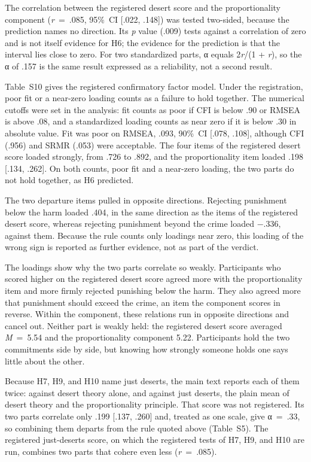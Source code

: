 The correlation between the registered desert score and the proportionality component (\emph{r}~=~.085, 95\%~CI {[}.022, .148{]}) was tested two-sided, because the prediction names no direction. Its \emph{p} value (.009) tests against a correlation of zero and is not itself evidence for H6; the evidence for the prediction is that the interval lies close to zero. For two standardized parts, α equals 2\emph{r}/(1 + \emph{r}), so the α of .157 is the same result expressed as a reliability, not a second result.

Table~S10 gives the registered confirmatory factor model. Under the registration, poor fit or a near-zero loading counts as a failure to hold together. The numerical cutoffs were set in the analysis: fit counts as poor if CFI is below .90 or RMSEA is above .08, and a standardized loading counts as near zero if it is below .30 in absolute value. Fit was poor on RMSEA, .093, 90\%~CI {[}.078, .108{]}, although CFI (.956) and SRMR (.053) were acceptable. The four items of the registered desert score loaded strongly, from .726 to .892, and the proportionality item loaded .198 {[}.134, .262{]}. On both counts, poor fit and a near-zero loading, the two parts do not hold together, as H6 predicted.

The two departure items pulled in opposite directions. Rejecting punishment below the harm loaded .404, in the same direction as the items of the registered desert score, whereas rejecting punishment beyond the crime loaded −.336, against them. Because the rule counts only loadings near zero, this loading of the wrong sign is reported as further evidence, not as part of the verdict.

The loadings show why the two parts correlate so weakly. Participants who scored higher on the registered desert score agreed more with the proportionality item and more firmly rejected punishing below the harm. They also agreed more that punishment should exceed the crime, an item the component scores in reverse. Within the component, these relations run in opposite directions and cancel out. Neither part is weakly held: the registered desert score averaged \emph{M}~=~5.54 and the proportionality component 5.22. Participants hold the two commitments side by side, but knowing how strongly someone holds one says little about the other.

Because H7, H9, and H10 name just deserts, the main text reports each of them twice: against desert theory alone, and against just deserts, the plain mean of desert theory and the proportionality principle. That score was not registered. Its two parts correlate only .199 {[}.137, .260{]} and, treated as one scale, give α~=~.33, so combining them departs from the rule quoted above (Table~S5). The registered just-deserts score, on which the registered tests of H7, H9, and H10 are run, combines two parts that cohere even less (\emph{r}~=~.085).

